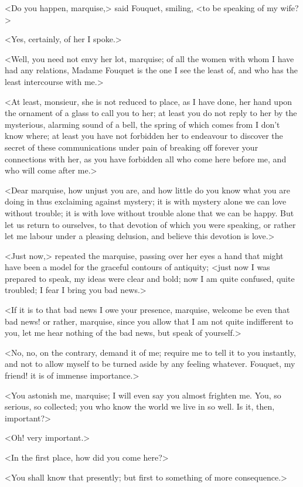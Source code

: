<Do you happen, marquise,> said Fouquet, smiling, <to be speaking of my wife?>

<Yes, certainly, of her I spoke.>

<Well, you need not envy her lot, marquise; of all the women with whom I have had any relations, Madame Fouquet is the one I see the least of, and who has the least intercourse with me.>

<At least, monsieur, she is not reduced to place, as I have done, her hand upon the ornament of a glass to call you to her; at least you do not reply to her by the mysterious, alarming sound of a bell, the spring of which comes from I don't know where; at least you have not forbidden her to endeavour to discover the secret of these communications under pain of breaking off forever your connections with her, as you have forbidden all who come here before me, and who will come after me.>

<Dear marquise, how unjust you are, and how little do you know what you are doing in thus exclaiming against mystery; it is with mystery alone we can love without trouble; it is with love without trouble alone that we can be happy. But let us return to ourselves, to that devotion of which you were speaking, or rather let me labour under a pleasing delusion, and believe this devotion is love.>

<Just now,> repeated the marquise, passing over her eyes a hand that might have been a model for the graceful contours of antiquity; <just now I was prepared to speak, my ideas were clear and bold; now I am quite confused, quite troubled; I fear I bring you bad news.>

<If it is to that bad news I owe your presence, marquise, welcome be even that bad news! or rather, marquise, since you allow that I am not quite indifferent to you, let me hear nothing of the bad news, but speak of yourself.>

<No, no, on the contrary, demand it of me; require me to tell it to you instantly, and not to allow myself to be turned aside by any feeling whatever. Fouquet, my friend! it is of immense importance.>

<You astonish me, marquise; I will even say you almost frighten me. You, so serious, so collected; you who know the world we live in so well. Is it, then, important?>

<Oh! very important.>

<In the first place, how did you come here?>

<You shall know that presently; but first to something of more consequence.>

